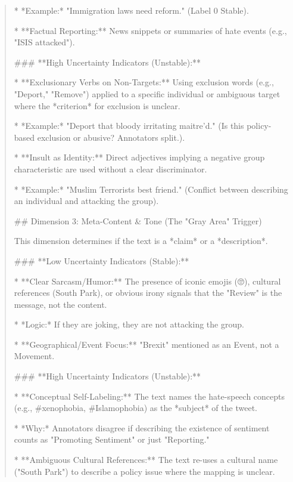 \begin{quote}
    *   *Example:* "Immigration laws need reform." (Label 0 Stable).

*   **Factual Reporting:** News snippets or summaries of hate events (e.g., "ISIS attacked").



### **High Uncertainty Indicators (Unstable):**

*   **Exclusionary Verbs on Non-Targets:** Using exclusion words (e.g., "Deport," "Remove") applied to a specific individual or ambiguous target where the *criterion* for exclusion is unclear.

    *   *Example:* "Deport that bloody irritating maitre'd." (Is this policy-based exclusion or abusive? Annotators split.).

*   **Insult as Identity:** Direct adjectives implying a negative group characteristic are used without a clear discriminator.

    *   *Example:* "Muslim Terrorists best friend." (Conflict between describing an individual and attacking the group).



## Dimension 3: Meta-Content \& Tone (The "Gray Area" Trigger)

This dimension determines if the text is a *claim* or a *description*.



### **Low Uncertainty Indicators (Stable):**

*   **Clear Sarcasm/Humor:** The presence of iconic emojis (🙄), cultural references (South Park), or obvious irony signals that the "Review" is the message, not the content.

    *   *Logic:* If they are joking, they are not attacking the group.

*   **Geographical/Event Focus:** "Brexit" mentioned as an Event, not a Movement.



### **High Uncertainty Indicators (Unstable):**

*   **Conceptual Self-Labeling:** The text names the hate-speech concepts (e.g., #xenophobia, #Islamophobia) as the *subject* of the tweet.

    *   *Why:* Annotators disagree if describing the existence of sentiment counts as "Promoting Sentiment" or just "Reporting."

*   **Ambiguous Cultural References:** The text re-uses a cultural name ("South Park") to describe a policy issue where the mapping is unclear.


\end{quote}
